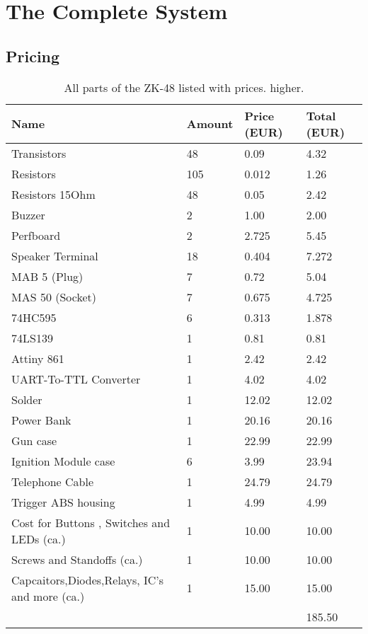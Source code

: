 \section{The Complete System}
\subsection{Pricing}

\begin{table}[!ht]
    \centering
    \begin{tabular}{|l|l|l|l|}
    \hline
        Name & Amount & Price (EUR) & Total (EUR)  \\ \hline \hline
        Transistors & 48 & 0.09 & 4.32 \\ \hline
        Resistors & 105 & 0.012 & 1.26  \\ \hline
        Resistors 15Ohm & 48 & 0.05 & 2.42 \\ \hline
        Buzzer & 2 & 1.00 & 2.00  \\ \hline
        Perfboard & 2 & 2.725 & 5.45 \\ \hline
        Speaker Terminal & 18 & 0.404 & 7.272\\ \hline
        MAB 5 (Plug) & 7 & 0.72 & 5.04  \\ \hline
        MAS 50 (Socket) & 7 & 0.675 & 4.725  \\ \hline
        74HC595 & 6 & 0.313 & 1.878  \\ \hline
        74LS139 & 1 & 0.81 & 0.81  \\ \hline
        Attiny 861 & 1 & 2.42 & 2.42\\ \hline
        UART-To-TTL Converter & 1 & 4.02 & 4.02  \\ \hline
        Solder & 1 & 12.02 & 12.02 \\ \hline
        Power Bank & 1 & 20.16 & 20.16  \\ \hline
        Gun case & 1 & 22.99 & 22.99 \\ \hline
        Ignition Module case & 6 & 3.99 & 23.94  \\ \hline
        Telephone Cable & 1 & 24.79 & 24.79  \\ \hline
        Trigger ABS housing & 1 & 4.99 & 4.99  \\ \hline
        Cost for Buttons , Switches and LEDs (ca.) & 1 & 10.00 & 10.00 \\ \hline
        Screws and Standoffs (ca.) & 1 & 10.00 & 10.00 \\ \hline
        Capcaitors,Diodes,Relays, IC's and more (ca.) & 1 & 15.00 & 15.00  \\ \hline\hline
        ~ & ~ & ~ & 185.50
  \\ \hline
    \end{tabular}
    \caption{All parts of the ZK-48 listed with prices. higher.}
    \label{tab:cost}
\end{table}

